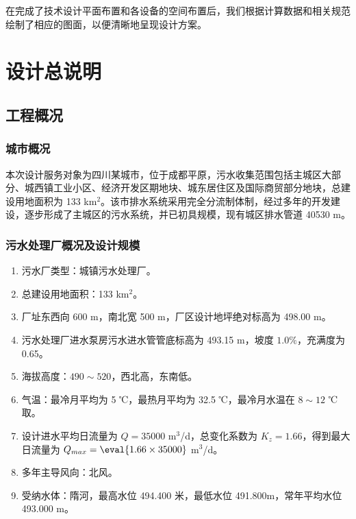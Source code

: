 在完成了技术设计平面布置和各设备的空间布置后，我们根据计算数据和相关规范绘制了相应的图面，以便清晰地呈现设计方案。





\newpage %

\section{设计总说明}
\subsection{工程概况}
\subsubsection{城市概况}
本次设计服务对象为四川某城市，位于成都平原，污水收集范围包括主城区大部分、城西镇工业小区、经济开发区期地块、城东居住区及国际商贸部分地块，总建设用地面积为 133 km$^2$。该市排水系统采用完全分流制体制，经过多年的开发建设，逐步形成了主城区的污水系统，并已初具规模，现有城区排水管道 40530 m。

\subsubsection{污水处理厂概况及设计规模}
\begin{enumerate}
	\item 污水厂类型：城镇污水处理厂。
	\item 总建设用地面积：133 km$^2$。
	\item 厂址东西向 600 m，南北宽 500 m，厂区设计地坪绝对标高为 498.00 m。
	\item 污水处理厂进水泵房污水进水管管底标高为 493.15 m，坡度 $1.0 \%$，充满度为 0.65。
	\item 海拔高度：$490\sim 520$，西北高，东南低。
	\item 气温：最冷月平均为 5 ℃，最热月平均为 32.5 ℃，最冷月水温在 $8\sim 12$ ℃取。
	\item 设计进水平均日流量为 $Q=35000$ m$^3$/d，总变化系数为 $K_z=1.66$，得到最大日流量为 $Q_{max}=\eval{1.66\times 35000}$ m$^3$/d。
	\item 多年主导风向：北风。
	\item 受纳水体：隋河，最高水位 494.400 米，最低水位 491.800m，常年平均水位 493.000 m。
\end{enumerate}

